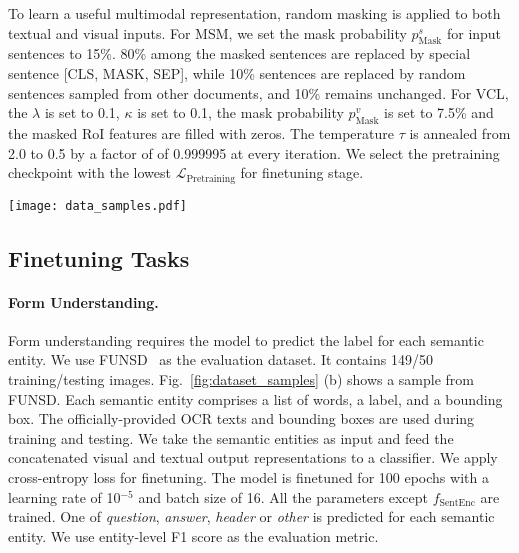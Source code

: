 \documentclass{article}
\begin{document}
	
	To {learn {a} useful} multimodal representation, {random} masking {is applied to both textual and visual inputs}. {For} MSM, we set the mask probability $p_{\text{Mask}}^s$ for input sentences to 15\%. 80\% among the masked sentences are replaced by special sentence [CLS, MASK, SEP], {while} 10\% sentences are replaced by random sentence{s} sampled from other documents, and 10\% remains {unchanged}. {For} VCL, {the $\lambda$ is set to 0.1, $\kappa$ is set to 0.1}, the mask probability $p_{\text{Mask}}^v$ is set to 7.5\% {and the masked} RoI features are {filled} with zeros. {The temperature $\tau$ is annealed from 2.0 to 0.5 by a factor of of 0.999995 at every iteration.} {We select the pretraining checkpoint with the lowest $\mathcal{L}_{\text{Pretraining}}$ for finetuning stage}.
	
	\begin{figure*}[t!]
		\vspace{-1mm}
		\begin{center}
			\texttt{[image: data\_samples.pdf]}
		\end{center}
		\vspace{-4mm}
		\caption{{Document image samples. The boxes in red/green are OCR bounding boxes {obtained} with/without paragraph mode, {while the} boxes in blue are officially-provided bounding boxes}.}
		\vspace{-4mm}
		\label{fig:dataset_samples}
	\end{figure*}
	
	\subsection{Finetuning Tasks}
	\paragraph{Form Understanding.}
	Form understanding requires the model to predict the label for each semantic entity. We use FUNSD~\cite{8892998} as the evaluation dataset. It contains 149/50 training/testing images. Fig.~\ref{fig:dataset_samples} (b) shows {a sample} from FUNSD. Each semantic entity comprises a list of words, a label, and a bounding box. {The officially-provided OCR texts and bounding boxes} are used during training and testing. We take the semantic entities as input and feed the concatenated visual and textual output representation{s} to a classifier. We apply cross-entropy loss {for finetuning}. The model is finetuned for 100 epochs with a learning rate of 10$^{-5}$ and batch size of 16. All the parameters except $f_{\text{SentEnc}}$ are {trained}. {One of} \textit{question}, \textit{answer}, \textit{header} or \textit{other} {is} {predicted} for each semantic entity. We use entity-level F1 score as the evaluation metric.
	
\end{document}

